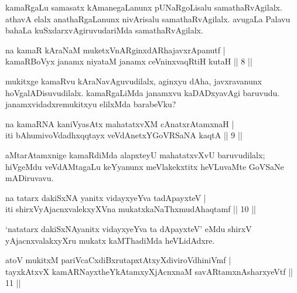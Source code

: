 \begin{artha}
kamaRgaLu samasatx kAmanegaLanunx pUNaRgoLisalu samathaRvAgilalx. 
athavA elalx anathaRgaLanunx nivArisalu samathaRvAgilalx. avugaLa 
Palavu bahaLa kuSxdarxvAgiruvudariMda samathaRvAgilalx.
\end{artha}


\begin{shl}
na kamaR kAraNaM muketxVnARginxdARhajavxrApanutf | \\
kamaRBoVyx janamx niyataM janamx ceVninxvaqRtiH kutaH \hfill|| 8 || 
\end{shl}

\begin{artha}
mukitxge kamaRvu kAraNavAguvudilalx, aginxyu dAha, javxravanunx 
hoVgalADisuvudilalx. kamaRgaLiMda janamxvu kaDADxyavAgi baruvudu. 
janamxvidadxre\break mukitxyu elilxMda barabeVku?
\end{artha}


\begin{shl}
na kamaRNA kaniVyasAtx mahatatxvXM cAnatxrAtamxnaH | \\
iti bAhumivoVdadhxqqtayx veVdAnetxYGoVRSaNA kaqtA \hfill|| 9  || 
\end{shl}

\begin{artha}
aMtarAtamxnige kamaRdiMda alapxteyU mahatatxvXvU baruvudilalx; hiVgeMdu veVdAMtagaLu keYyanunx meVlakekxtitx heVLuvaMte GoVSaNe mADiruvavu.
\end{artha}


\begin{shl}
na tatarx dakiSxNA yanitx vidayxyeYva tadApayxteV | \\
iti shirxVyAjacnxvalekxyXVna mukatxkaNaThxmudAhaqtamf \hfill || 10 || 
\end{shl}

\begin{artha}
`natatarx dakiSxNAyanitx vidayxyeYva ta dApayxteV' eMdu shirxV yAjacnxvalakxyXru mukatx kaMThadiMda heVLidAdxre.
\end{artha}

\begin{shl}
atoV mukitxM pariVcaCxdiBxrutapxtAtxyXdiviroVdhiniVmf | \\
tayxkAtxvX kamARNayxtheYkAtamxyXjAcnxnaM savARtamxnA\s \s sharxyeVtf \hfill|| 11 || 
\end{shl}

